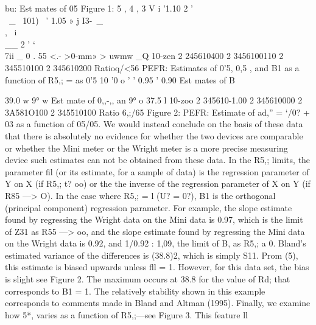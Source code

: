 bu:
Est mates of 05
Figure 1:
5 ,
4 ,
3 V i '1.10
2 ' ~\\ \ _
\
101)  \ ’ 1.05
» j I3-\ _
  \\
, \ i
\\
__ 2 ' ‘\\7ii _
0%
. 55
<.- >0-mm»
> uwmw
_Q
10-zen 2 245610400 2 3456100110 2 345510100 2 345610200
Ratioq/<56
PEFR: Estimates of 0'5, 0,5 , and B1 as a function of R5,; = as 0'5
10
'0
o
' ' 0.95
' 0.90
Est mates of B



39.0
w
9°
w
Est mate of 0,,-,,
an
9°
o
37.5
l    
10-zoo 2 345610-1.00 2 345610000 2 3A581O100 2 345510100
Ratio 6,;/65
Figure 2: PEFR: Estimate of ad,” = ‘/0? + 03 as a function of 05/05.
We would instead conclude on the basis of these data that there is absolutely
no evidence for whether the two devices are comparable or whether the Mini meter
or the Wright meter is a more precise measuring device such estimates can not be
obtained from these data.
In the R5,; limits, the parameter ﬁl (or its estimate, for a sample of data) is the
regression parameter of Y on X (if R5,; t? oo) or the the inverse of the regression
parameter of X on Y (if R85 —> O). In the case where R5,; = l (U? = 0?), B1 is
the orthogonal (principal component) regression parameter. For example, the slope
estimate found by regressing the Wright data on the Mini data is 0.97, which is the
limit of Z31 as R55 —> oo, and the slope estimate found by regressing the Mini data on
the Wright data is 0.92, and 1/0.92 : 1,09, the limit of B, as R5,; a 0.
Bland’s estimated variance of the differences is (38.8)2, which is simply S11. Prom
(5), this estimate is biased upwards unless ﬂl = 1. However, for this data set, the
bias is slight see Figure 2. The maximum occurs at 38.8 for the value of Rd; that
corresponds to B1 = 1. The relatively stability shown in this example corresponds to
comments made in Bland and Altman (1995).
Finally, we examine how 5*, varies as a function of R5,;—see Figure 3. This feature
ll



